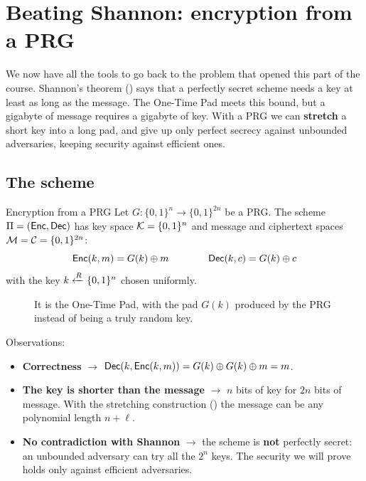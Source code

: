 
\section{Beating Shannon: encryption from a PRG}\label{sec:prg-encryption}

We now have all the tools to go back to the problem that opened this part of the course. Shannon's theorem () says that a perfectly secret scheme needs a key at least as long as the message. The One-Time Pad meets this bound, but a gigabyte of message requires a gigabyte of key. With a PRG we can \textbf{stretch} a short key into a long pad, and give up only perfect secrecy against unbounded adversaries, keeping security against efficient ones.

\subsection{The scheme}

\begin{frameddefn}[label={def:prg-otp}]{Encryption from a PRG}
  Let $G : \{0,1\}^n \to \{0,1\}^{2n}$ be a PRG. The scheme $\Pi = (\mathsf{Enc}, \mathsf{Dec})$ has key space $\mathcal{K} = \{0,1\}^n$ and message and ciphertext spaces $\mathcal{M} = \mathcal{C} = \{0,1\}^{2n}$:
  \[
    \mathsf{Enc}(k, m) = G(k) \oplus m \qquad\qquad \mathsf{Dec}(k, c) = G(k) \oplus c
  \]
  with the key $k \xleftarrow{R} \{0,1\}^n$ chosen uniformly.
\end{frameddefn}

\begin{figure}[H]
  \centering
  \caption{It is the One-Time Pad, with the pad $G(k)$ produced by the PRG instead of being a truly random key.}
\end{figure}

Observations:
\begin{itemize}
  \item \textbf{Correctness} $\to$ $\mathsf{Dec}(k, \mathsf{Enc}(k, m)) = G(k) \oplus G(k) \oplus m = m$.
  \item \textbf{The key is shorter than the message} $\to$ $n$ bits of key for $2n$ bits of message. With the stretching construction () the message can be any polynomial length $n + \ell$.
  \item \textbf{No contradiction with Shannon} $\to$ the scheme is \textbf{not} perfectly secret: an unbounded adversary can try all the $2^n$ keys. The security we will prove holds only against efficient adversaries.
\end{itemize}


